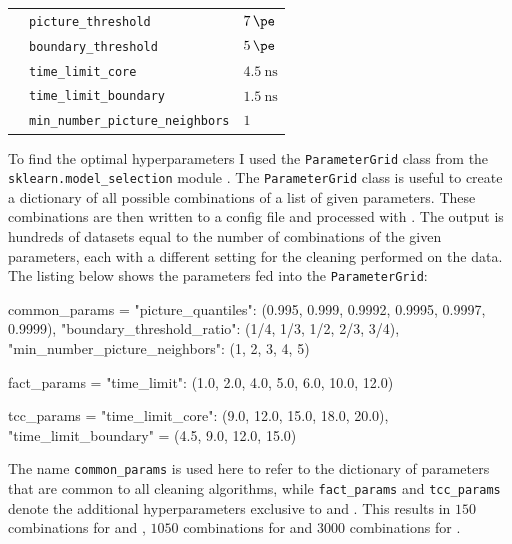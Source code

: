 \begin{table}
\begin{tabular}{l l l}
        \addlinespace[0.5em]
        \tcc{}      & \texttt{picture\_threshold}               & \qquad\(\SI{7}{\pe}\) \\
                    & \texttt{boundary\_threshold}              & \qquad\(\SI{5}{\pe}\) \\
                    & \texttt{time\_limit\_core}                & \qquad\(\SI{4.5}{\nano\second}\) \\
                    & \texttt{time\_limit\_boundary}            & \qquad\(\SI{1.5}{\nano\second}\) \\
                    & \texttt{min\_number\_picture\_neighbors}  & \qquad\(\num{1}\) \\
  \end{tabular}
\end{table}

To find the optimal hyperparameters I used the \texttt{ParameterGrid} class from the
\texttt{sklearn.model\_selection} module \cite{scikit-learn}. The \texttt{ParameterGrid} class is useful to create a
dictionary of all possible combinations of a list of given parameters. These combinations are then
written to a config file and processed with \ctapipe{}. The output is hundreds of datasets equal to
the number of combinations of the given parameters, each with a different setting for the cleaning
performed on the data. The listing below shows the parameters fed into the \texttt{ParameterGrid}:

\begin{minipage}{\textwidth}
    \begin{mdframed}[backgroundcolor=white!20!black,leftmargin=0cm,rightmargin=0cm, skipabove=0pt, innerleftmargin=0,innerrightmargin=0,]
    \begin{pythonlst}
        common_params = {
            "picture_quantiles": (0.995, 0.999, 0.9992, 0.9995, 0.9997, 0.9999),
            "boundary_threshold_ratio": (1/4, 1/3, 1/2, 2/3, 3/4),
            "min_number_picture_neighbors": (1, 2, 3, 4, 5)
        }

        fact_params = {
            "time_limit": (1.0, 2.0, 4.0, 5.0, 6.0, 10.0, 12.0)
        }

        tcc_params = {
            "time_limit_core": (9.0, 12.0, 15.0, 18.0, 20.0),
            "time_limit_boundary" = (4.5, 9.0, 12.0, 15.0)
        }
    \end{pythonlst}
    \end{mdframed}
  \end{minipage}

The name \texttt{common\_params} is used here to refer to the dictionary of parameters that are common
to all cleaning algorithms, while \texttt{fact\_params} and \texttt{tcc\_params} denote the additional
hyperparameters exclusive to \fact{} and \tcc{}. This results in \(\num{150}\) combinations for
\tailcuts{} and \mars{}, \(\num{1050}\) combinations for \fact{} and \(\num{3000}\) combinations for \tcc{}.

